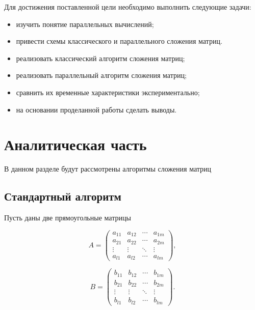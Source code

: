 Для достижения поставленной цели необходимо выполнить следующие задачи:
\begin{itemize}
    \item изучить понятие параллельных вычислений;
    \item привести схемы классического и параллельного сложения матриц.
    \item реализовать классический алгоритм сложения матриц;
    \item реализовать параллельный алгоритм сложения матриц;
    \item сравнить их временные характеристики экспериментально;
    \item на основании проделанной работы сделать выводы.
\end{itemize}

\section{Аналитическая часть}

В данном разделе будут рассмотрены алгоритмы сложения матриц

\subsection{Стандартный алгоритм}

Пусть даны две прямоугольные матрицы

\begin{equation}
    A =
      \begin{pmatrix}
        a_{11} & a_{12} & \cdots & a_{1m} \\
        a_{21} & a_{22} & \cdots & a_{2m} \\
        \vdots & \vdots & \ddots & \vdots \\
        a_{l1} & a_{l2} & \cdots & a_{lm}
      \end{pmatrix},
\end{equation}

\begin{equation}
    B =
    \begin{pmatrix}
      b_{11} & b_{12} & \cdots & b_{1m} \\
      b_{21} & b_{22} & \cdots & b_{2m} \\
      \vdots & \vdots & \ddots & \vdots \\
      b_{l1} & b_{l2} & \cdots & b_{lm}
    \end{pmatrix}.
\end{equation}

